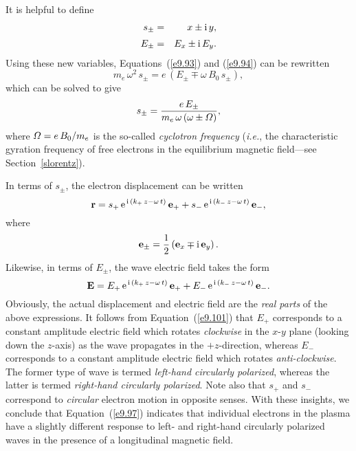 It is helpful to define
\begin{eqnarray}
s_\pm &=& x\pm {\rm i}\,y,\\[0.5ex]
E_\pm &=& E_x\pm {\rm i}\,E_y.
\end{eqnarray}
Using these new variables, Equations~(\ref{e9.93}) and (\ref{e9.94})
can be rewritten
\begin{equation}
m_e\,\omega^2\,s_{\pm} = e\,(E_{\pm} \mp \omega\,B_0\,s_\pm),
\end{equation}
which can be solved to give
\begin{equation}\label{e9.97}
s_\pm = \frac{e\,E_\pm}{m_e\,\omega\,(\omega\pm{\mit \Omega})},
\end{equation}
where ${\mit \Omega} = e\,B_0/m_e$ is the so-called {\em cyclotron frequency} ({\em i.e.},
the characteristic gyration frequency of free electrons in the
equilibrium magnetic field---see Section~\ref{slorentz}).

In terms of $s_\pm$, the electron displacement can be written
\begin{equation}
{\bf r} = s_+\,{\rm e}^{\,{\rm i}\,(k_+\,z-\omega\,t)}\,{\bf e}_+
+  s_-\,{\rm e}^{\,{\rm i}\,(k_-\,z-\omega\,t)}\,{\bf e}_-,
\end{equation}
where
\begin{equation}
{\bf e}_\pm = \frac{1}{2}\left({\bf e}_x \mp {\rm i}\,{\bf e}_y\right).
\end{equation}
Likewise, in terms of $E_\pm$, the wave electric field takes the form
\begin{equation}\label{e9.101}
{\bf E} = E_+\,{\rm e}^{\,{\rm i}\,(k_+\,z-\omega\,t)}\,{\bf e}_+
+  E_-\,{\rm e}^{\,{\rm i}\,(k_-\,z-\omega\,t)}\,{\bf e}_-.
\end{equation}
Obviously, the actual displacement and electric field are the {\em real
parts} of the above expressions. It follows from Equation~(\ref{e9.101})
that $E_+$ corresponds to a constant amplitude electric field which rotates {\em clockwise}
in the $x$-$y$ plane (looking down the $z$-axis) as the wave propagates in the $+z$-direction, whereas
$E_-$ corresponds to a constant amplitude electric field which rotates {\em anti-clockwise}.
The former type of wave is termed {\em left-hand circularly polarized},
whereas the latter is termed {\em right-hand circularly polarized}. 
Note also that $s_+$ and $s_-$ correspond to {\em circular} electron motion
in opposite senses.
With these insights, we conclude that Equation~(\ref{e9.97}) indicates that
individual electrons in the plasma have a slightly different response to left- and right-hand circularly polarized waves in the presence of a
longitudinal magnetic field.

